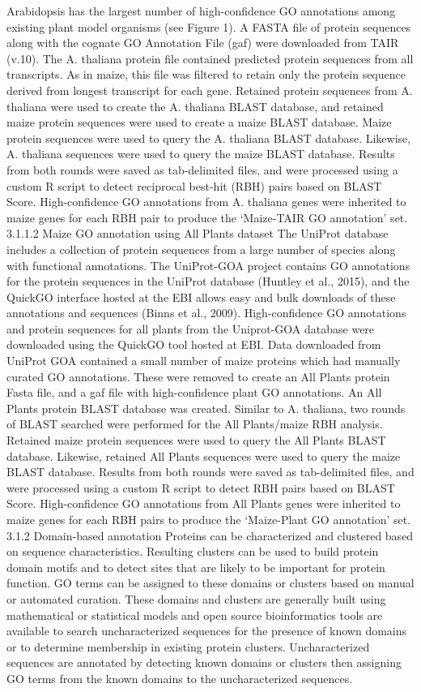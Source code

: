     Arabidopsis has the largest number of high-confidence GO annotations among existing plant model organisms (see Figure 1). A FASTA file of protein sequences along with the cognate GO Annotation File (gaf) were downloaded from TAIR (v.10). The A. thaliana protein file contained predicted protein sequences from all transcripts. As in maize, this file was filtered to retain only the protein sequence derived from longest transcript for each gene. Retained protein sequences from A. thaliana were used to create the A. thaliana BLAST database, and retained maize protein sequences were used to create a maize BLAST database. Maize protein sequences were used to query the A. thaliana BLAST database. Likewise, A. thaliana sequences were used to query the maize BLAST database. Results from both rounds were saved as tab-delimited files, and were processed using a custom R script to detect reciprocal best-hit (RBH) pairs based on BLAST Score. High-confidence GO annotations from A. thaliana genes were inherited to maize genes for each RBH pair to produce the ‘Maize-TAIR GO annotation’ set.
3.1.1.2 Maize GO annotation using All Plants dataset
	The UniProt database includes a collection of protein sequences from a large number of species along with functional annotations. The UniProt-GOA project contains GO annotations for the protein sequences in the UniProt database (Huntley et al., 2015), and the QuickGO interface hosted at the EBI allows easy and bulk downloads of these annotations and sequences (Binns et al., 2009). High-confidence GO annotations and protein sequences for all plants from the Uniprot-GOA database were downloaded using the QuickGO tool hosted at EBI. Data downloaded from UniProt GOA contained a small number of  maize proteins which had manually curated GO annotations. These were removed to create an All Plants protein Fasta file, and a gaf file with high-confidence plant GO annotations. An All Plants protein BLAST database was created. Similar to A. thaliana, two rounds of BLAST searched were performed for the All Plants/maize RBH analysis. Retained maize protein sequences were used to query the All Plants BLAST database. Likewise, retained All Plants sequences were used to query the maize BLAST database. Results from both rounds were saved as tab-delimited files, and were processed using a custom R script to detect RBH pairs based on BLAST Score. High-confidence GO annotations from All Plants genes were inherited to maize genes for each RBH pairs to produce the ‘Maize-Plant GO annotation’ set.
3.1.2 Domain-based annotation
Proteins can be characterized and clustered based on sequence characteristics. Resulting clusters can be used to build protein domain motifs and to detect sites that are likely to be important for protein function. GO terms can be assigned to these domains or clusters based on manual or automated curation. These domains and clusters are generally built using mathematical or statistical models and open source bioinformatics tools are available to search uncharacterized sequences for the presence of known domains or to determine membership in existing protein clusters. Uncharacterized sequences are annotated by detecting known domains or clusters then assigning GO terms from the known domains to the uncharacterized sequences.
